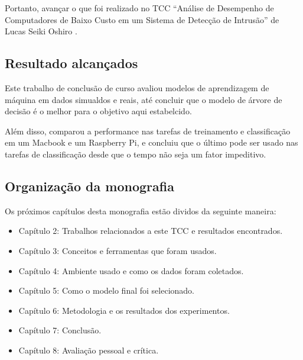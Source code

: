 Portanto, avançar o que foi realizado no TCC “Análise de Desempenho de Computadores de Baixo Custo em um Sistema de 
Detecção de Intrusão” de Lucas Seiki Oshiro \cite{tcc:lucas}.

\subsection{Resultado alcançados}

Este trabalho de conclusão de curso avaliou modelos de aprendizagem de máquina em dados simualdos e 
reais, até concluir que o modelo de árvore de decisão é o melhor para o objetivo aqui estabelcido.

Além disso, comparou a performance nas tarefas de treinamento e classificação em um Macbook e um 
Raspberry Pi, e concluiu que o último pode ser usado nas tarefas de classificação desde que o tempo
não seja um fator impeditivo.

\subsection{Organização da monografia}

Os próximos capítulos desta monografia estão dividos da seguinte maneira: 

\begin{itemize}
    \item Capítulo 2: Trabalhos relacionados a este TCC e resultados encontrados.
    \item Capítulo 3: Conceitos e ferramentas que foram usados.
    \item Capítulo 4: Ambiente usado e como os dados foram coletados.
    \item Capítulo 5: Como o modelo final foi selecionado.
    \item Capítulo 6: Metodologia e os resultados dos experimentos.
    \item Capítulo 7: Conclusão.
    \item Capítulo 8: Avaliação pessoal e crítica.
\end{itemize}